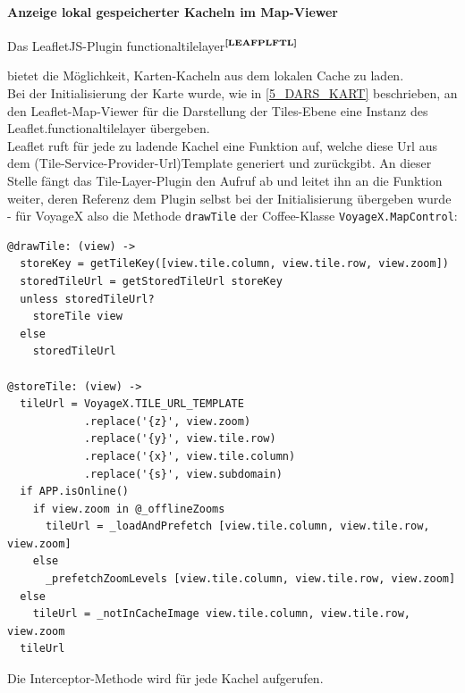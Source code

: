 \paragraph{Anzeige lokal gespeicherter Kacheln im Map-Viewer}
Das LeafletJS-Plugin functionaltilelayer$^{\textbf{\ref{LEAFPLFTL}}}$
\addtocounter{footnote}{1}%
%
bietet die Möglichkeit, Karten-Kacheln aus dem lokalen Cache zu laden.\\
Bei der Initialisierung der Karte wurde, wie in \ref{5_DARS_KART} beschrieben, an den Leaflet-Map-Viewer für die Darstellung der Tiles-Ebene eine Instanz des Leaflet.functionaltilelayer übergeben.\\
Leaflet ruft für jede zu ladende Kachel eine Funktion auf, welche diese Url aus dem (Tile-Service-Provider-Url)Template generiert und zurückgibt. An dieser Stelle fängt das Tile-Layer-Plugin den Aufruf ab und leitet
ihn an die Funktion weiter, deren Referenz dem Plugin selbst bei der Initialisierung übergeben wurde - für VoyageX also die Methode \texttt{drawTile} der Coffee-Klasse \texttt{VoyageX.MapControl}:
\lstset{language=CoffeeScript}
\begin{lstlisting}[frame=single,xleftmargin=0pt]
@drawTile: (view) ->
  storeKey = getTileKey([view.tile.column, view.tile.row, view.zoom])
  storedTileUrl = getStoredTileUrl storeKey
  unless storedTileUrl?
    storeTile view
  else
    storedTileUrl

@storeTile: (view) ->
  tileUrl = VoyageX.TILE_URL_TEMPLATE
            .replace('{z}', view.zoom)
            .replace('{y}', view.tile.row)
            .replace('{x}', view.tile.column)
            .replace('{s}', view.subdomain)
  if APP.isOnline()
    if view.zoom in @_offlineZooms
   	  tileUrl = _loadAndPrefetch [view.tile.column, view.tile.row, view.zoom]
    else
      _prefetchZoomLevels [view.tile.column, view.tile.row, view.zoom]
  else
    tileUrl = _notInCacheImage view.tile.column, view.tile.row, view.zoom
  tileUrl
\end{lstlisting}%
Die Interceptor-Methode wird für jede Kachel aufgerufen.\\
